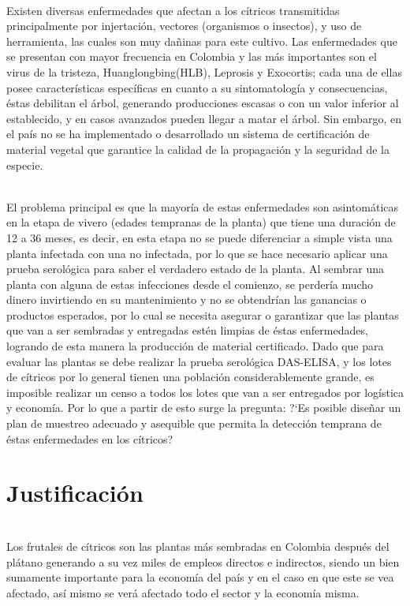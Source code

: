 ~\\Existen diversas enfermedades que afectan a los c\'{i}tricos transmitidas principalmente por injertaci\'{o}n, vectores (organismos o insectos), y uso de herramienta, las cuales son muy da\~{n}inas para este cultivo. Las enfermedades que se presentan con mayor frecuencia en Colombia y las m\'{a}s importantes son el virus de la tristeza, Huanglongbing(HLB), Leprosis y Exocortis; cada una de ellas posee caracter\'{i}sticas espec\'{i}ficas en cuanto a su sintomatolog\'{i}a y consecuencias, \'{e}stas debilitan el \'{a}rbol, generando producciones escasas o con un valor inferior al establecido, y en casos avanzados pueden llegar a matar el \'{a}rbol. Sin embargo, en el pa\'{i}s no se ha implementado o desarrollado un sistema de certificaci\'{o}n de material vegetal que garantice la calidad de la propagaci\'{o}n y la seguridad de la especie.

~\\El problema principal es que la mayor\'{i}a de estas enfermedades son asintom\'{a}ticas en la etapa de vivero (edades tempranas de la planta) que tiene una duraci\'{o}n de 12 a 36 meses, es decir, en esta etapa no se puede diferenciar a simple vista una planta infectada con una no infectada, por lo que se hace necesario aplicar una prueba serol\'{o}gica para saber el verdadero estado de la planta. Al sembrar una planta con alguna de estas infecciones desde el comienzo, se perder\'{i}a mucho dinero invirtiendo en su mantenimiento y no se obtendr\'{i}an las ganancias o productos esperados, por lo cual se necesita asegurar o garantizar que las plantas que van a ser sembradas y entregadas est\'{e}n limpias de \'{e}stas enfermedades, logrando de esta manera la producci\'{o}n de material certificado. Dado que para evaluar las plantas se debe realizar la prueba serol\'{o}gica DAS-ELISA, y los lotes de c\'{i}tricos por lo general tienen una poblaci\'{o}n considerablemente grande, es imposible realizar un censo a todos los lotes que van a ser entregados por log\'{i}stica y econom\'{i}a. Por lo que a partir de esto surge la pregunta: ?`Es posible dise\~{n}ar un plan de muestreo adecuado y asequible que permita la detecci\'{o}n temprana de \'{e}stas enfermedades en los c\'{i}tricos?


\section{Justificaci\'{o}n}
~\\Los frutales de c\'{i}tricos son las plantas m\'{a}s sembradas en Colombia despu\'{e}s del pl\'{a}tano generando a su vez miles de empleos directos e indirectos, siendo un bien sumamente importante para la econom\'{i}a del pa\'{i}s y en el caso en que este se vea afectado, as\'{i} mismo se ver\'{a} afectado todo el sector y la econom\'{i}a misma. 

